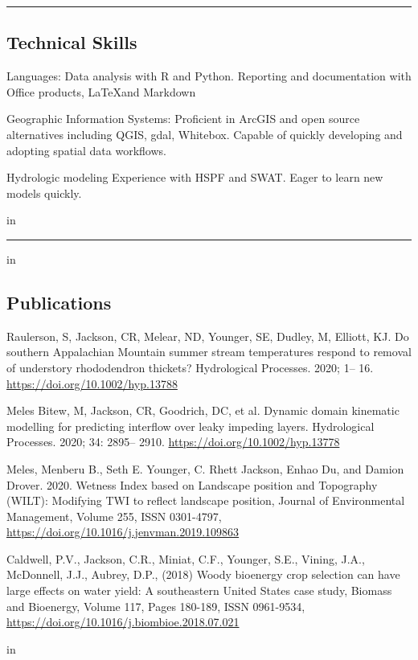 \documentclass[10pt,letterpaper]{article}
\newenvironment{indentsection}[1]%
{\begin{list}{}%
	{\setlength{\leftmargin}{#1}}%
	\item[]%
}
{\end{list}}
\begin{document}
\pagebreak

\hrule
\vspace{-0.4em}
\subsection*{Technical Skills}

\begin{indentsection}{\parindent}
	\begin{description*}
		\item[Languages:]
		Data analysis with R and Python. Reporting and documentation with Office products, \LaTeX and Markdown
		\item[Geographic Information Systems:]
		Proficient in ArcGIS and open source alternatives including QGIS, gdal, Whitebox. Capable of quickly developing and adopting spatial data workflows.
		\item[Hydrologic modeling]
		Experience with HSPF and SWAT. Eager to learn new models quickly.
	\end{description*}
\end{indentsection}
		
		\vspace{-0.4em}
		 in
		
\hrule
\vspace{-0.4em}
 in
\subsection*{Publications}

\begin{hangparas}{.25in}{1}

Raulerson, S, Jackson, CR, Melear, ND, Younger, SE, Dudley, M, Elliott, KJ. Do southern Appalachian Mountain summer stream temperatures respond to removal of understory rhododendron thickets? Hydrological Processes. 2020; 1– 16. \url{https://doi.org/10.1002/hyp.13788}

Meles Bitew, M, Jackson, CR, Goodrich, DC, et al. Dynamic domain kinematic modelling for predicting interflow over leaky impeding layers. Hydrological Processes. 2020; 34: 2895– 2910. \url{https://doi.org/10.1002/hyp.13778}

Meles, Menberu B., Seth E. Younger, C. Rhett Jackson, Enhao Du, and Damion Drover. 2020. Wetness Index based on Landscape position and Topography (WILT): Modifying TWI to reflect landscape position, Journal of Environmental Management, Volume 255, ISSN 0301-4797, \url{https://doi.org/10.1016/j.jenvman.2019.109863}

Caldwell, P.V., Jackson, C.R., Miniat, C.F., Younger, S.E., Vining, J.A., McDonnell, J.J., Aubrey, D.P., (2018) Woody bioenergy crop selection can have large effects on water yield: A southeastern United States case study,
Biomass and Bioenergy, Volume 117, Pages 180-189, ISSN 0961-9534, \url{https://doi.org/10.1016/j.biombioe.2018.07.021}

 in
\vspace{-0.4em}

\end{hangparas}
\end{document}
